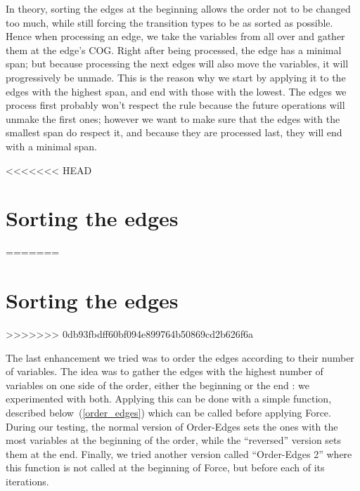 \documentclass[12pt]{report}
\begin{document}
In theory, sorting the edges at the beginning allows the order not to be changed too much, while still forcing the transition types to be as sorted as possible. Hence when processing an edge, we take the variables from all over and gather them at the edge's COG. Right after being processed, the edge has a minimal span; but because processing the next edges will also move the variables, it will progressively be unmade. This is the reason why we start by applying it to the edges with the highest span, and end with those with the lowest. The edges we process first probably won't respect the rule because the future operations will unmake the first ones; however we want to make sure that the edges with the smallest span do respect it, and because they are processed last, they will end with a minimal span.

<<<<<<< HEAD
\section{Sorting the edges} \label{sec:order_edges}
=======
\newpage
\section{Sorting the edges}
>>>>>>> 0db93fbdff60bf094e899764b50869cd2b626f6a

The last enhancement we tried was to order the edges according to their number of variables. The idea was to gather the edges with the highest number of variables on one side of the order, either the beginning or the end : we experimented with both. Applying this can be done with a simple function, described below~(\ref{order_edges}) which can be called before applying Force. During our testing, the normal version of Order-Edges sets the ones with the most variables at the beginning of the order, while the \enquote{reversed} version sets them at the end.
Finally, we tried another version called \enquote{Order-Edges 2} where this function is not called at the beginning of Force, but before each of its iterations.

\begin{algorithm}
  \begin{algorithmic}[1]
    \EndFunction
    \label{order_edges}
  \end{algorithmic}
\end{algorithm}
\end{document}
